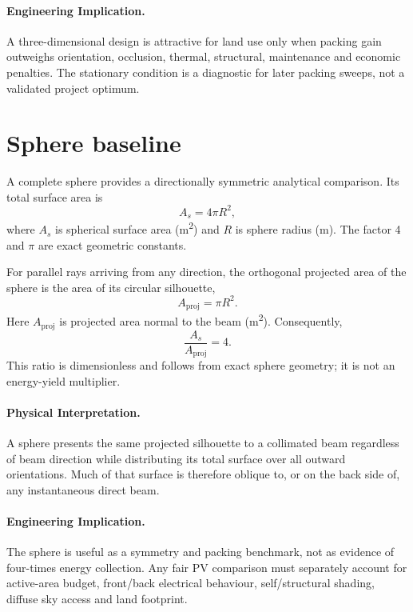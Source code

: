 \documentclass[11pt,a4paper]{article}
\begin{document}
\paragraph{Engineering Implication.}
A three-dimensional design is attractive for land use only when packing gain outweighs orientation, occlusion, thermal, structural, maintenance and economic penalties. The stationary condition is a diagnostic for later packing sweeps, not a validated project optimum.

\section{Sphere baseline}
A complete sphere provides a directionally symmetric analytical comparison. Its total surface area is
\begin{equation}
A_s=4\pi R^2,
\label{eq:sphere-area}
\end{equation}
where \(A_s\) is spherical surface area (\si{\square\metre}) and \(R\) is sphere radius (\si{\metre}). The factor 4 and \(\pi\) are exact geometric constants.

For parallel rays arriving from any direction, the orthogonal projected area of the sphere is the area of its circular silhouette,
\begin{equation}
A_{\mathrm{proj}}=\pi R^2.
\label{eq:sphere-projected-area}
\end{equation}
Here \(A_{\mathrm{proj}}\) is projected area normal to the beam (\si{\square\metre}). Consequently,
\begin{equation}
\frac{A_s}{A_{\mathrm{proj}}}=4.
\end{equation}
This ratio is dimensionless and follows from exact sphere geometry; it is not an energy-yield multiplier.

\paragraph{Physical Interpretation.}
A sphere presents the same projected silhouette to a collimated beam regardless of beam direction while distributing its total surface over all outward orientations. Much of that surface is therefore oblique to, or on the back side of, any instantaneous direct beam.

\paragraph{Engineering Implication.}
The sphere is useful as a symmetry and packing benchmark, not as evidence of four-times energy collection. Any fair PV comparison must separately account for active-area budget, front/back electrical behaviour, self/structural shading, diffuse sky access and land footprint.
\end{document}
